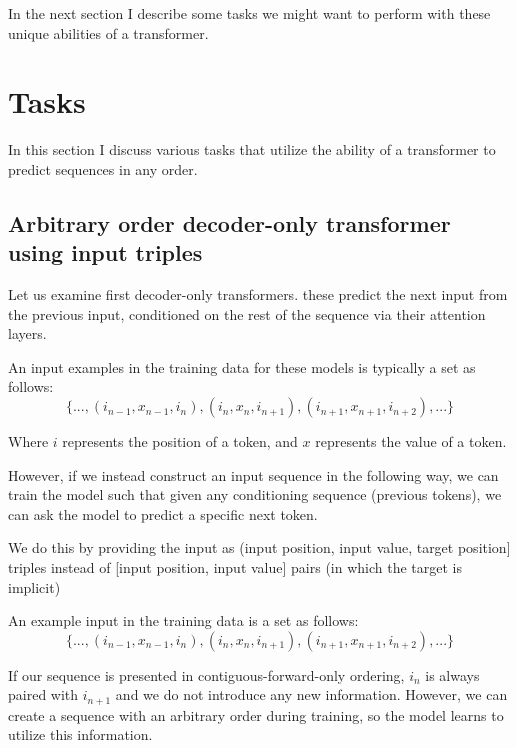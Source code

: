 In the next section I describe some tasks we might want to perform with these unique abilities of a transformer.

\section{Tasks}
\label{s:order-tasks}

In this section I discuss various tasks that utilize the ability of a transformer to predict sequences in any order.

\subsection{Arbitrary order decoder-only transformer using input triples}
\label{ss:decoder-only-triples}

Let us examine first decoder-only transformers. these predict the next input from the previous input, conditioned on the rest of the sequence via their attention layers. 

An input examples in the training data for these models is typically a set as follows:
$$
   \{ ..., (i_{n-1}, x_{n-1}, i_{n}), (i_{n}, x_{n}, i_{n+1}), (i_{n+1}, x_{n+1}, i_{n+2}), ... \}
$$

Where $i$ represents the position of a token, and $x$ represents the value of a token.

However, if we instead construct an input sequence in the following way, we can train the model such that given any conditioning sequence (previous tokens), we can ask the model to predict a specific next token.

We do this by providing the input as (input position, input value, target position] triples instead of [input position, input value] pairs (in which the target is implicit)



An example input in the training data is a set as follows:
$$
   \{ ..., (i_{n-1}, x_{n-1}, i_{n}), (i_{n}, x_{n}, i_{n+1}), (i_{n+1}, x_{n+1}, i_{n+2}), ... \}
$$


If our sequence is presented in contiguous-forward-only ordering, $i_n$ is always paired with $i_{n+1}$ and we do not introduce any new information. However, we can create a sequence with an arbitrary order during training, so the model learns to utilize this information.

